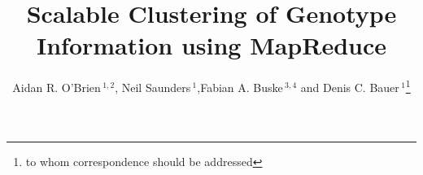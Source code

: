 \documentclass{bioinfo}
\begin{document}

	
\newcommand{\OnePhaseone}{phase1\_chr1}
\newcommand{\NinteenPhaseone}{phase1\_chr19}
\newcommand{\SevenPhaseone}{phase1\_chr1-7}
\newcommand{\FullPhaseone}{phase1\_chr1-22}
\newcommand{\OnePhasethree}{phase3\_chr1}
\newcommand{\ThreePhasethree}{phase3\_chr1-3}
\newcommand{\FullPhasethree}{phase3\_chr1-22}
\newcommand{\ARI}{Adjusted Rand Index}

\title[MapReduce Clustering]{Scalable Clustering of Genotype Information using MapReduce}
\author[O'Brien \textit{et~al}]{Aidan R. O'Brien\,$^{1,2}$, Neil Saunders\,$^1$,Fabian A. Buske\,$^{3,4}$ and Denis C. Bauer\,$^1$\footnote{to whom correspondence should be addressed}}
\address{$^{1}$CSIRO, Digital Productivity Flagship, 11 Julius Av, 2113, Sydney, Australia\\
$^{2}$School of Biomedical Sciences and Pharmacy, Faculty of Health, 2308 Newcastle, Australia\\
$^{3}$Cancer Epigenetics Program, Cancer Research Division, Kinghorn Cancer Centre, Garvan Institute of Medical Research, 384 Victoria St, 2010, Sydney, Australia\\
$^{4}$UNSW Medicine, University of New South Wales, 2052 Sydney, Australia.}



\maketitle
\end{document}
